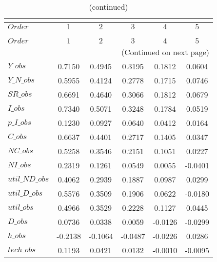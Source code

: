  
\begin{center}
\begin{longtable}{lccccc} 
\caption{COEFFICIENTS OF AUTOCORRELATION}\\
 \label{Table:th_autocorr_matrix}\\
\toprule 
$Order          $	 & 	 $          1$	 & 	 $          2$	 & 	 $          3$	 & 	 $          4$	 & 	 $          5$\\
\midrule \endfirsthead 
\caption{(continued)}\\
 \toprule \\ 
$Order          $	 & 	 $          1$	 & 	 $          2$	 & 	 $          3$	 & 	 $          4$	 & 	 $          5$\\
\midrule \endhead 
\midrule \multicolumn{6}{r}{(Continued on next page)} \\ \bottomrule \endfoot 
\bottomrule \endlastfoot 
$Y\_obs         $	 & 	     0.7150	 & 	     0.4945	 & 	     0.3195	 & 	     0.1812	 & 	     0.0604 \\ 
$Y\_N\_obs      $	 & 	     0.5955	 & 	     0.4124	 & 	     0.2778	 & 	     0.1715	 & 	     0.0746 \\ 
$SR\_obs        $	 & 	     0.6691	 & 	     0.4640	 & 	     0.3066	 & 	     0.1812	 & 	     0.0679 \\ 
$I\_obs         $	 & 	     0.7340	 & 	     0.5071	 & 	     0.3248	 & 	     0.1784	 & 	     0.0519 \\ 
$p\_I\_obs      $	 & 	     0.1230	 & 	     0.0927	 & 	     0.0640	 & 	     0.0412	 & 	     0.0164 \\ 
$C\_obs         $	 & 	     0.6637	 & 	     0.4401	 & 	     0.2717	 & 	     0.1405	 & 	     0.0347 \\ 
$NC\_obs        $	 & 	     0.5258	 & 	     0.3546	 & 	     0.2151	 & 	     0.1051	 & 	     0.0227 \\ 
$NI\_obs        $	 & 	     0.2319	 & 	     0.1261	 & 	     0.0549	 & 	     0.0055	 & 	    -0.0401 \\ 
$util\_ND\_obs  $	 & 	     0.4062	 & 	     0.2939	 & 	     0.1887	 & 	     0.0987	 & 	     0.0299 \\ 
$util\_D\_obs   $	 & 	     0.5576	 & 	     0.3509	 & 	     0.1906	 & 	     0.0622	 & 	    -0.0180 \\ 
$util\_obs      $	 & 	     0.4966	 & 	     0.3529	 & 	     0.2228	 & 	     0.1127	 & 	     0.0445 \\ 
$D\_obs         $	 & 	     0.0736	 & 	     0.0338	 & 	     0.0059	 & 	    -0.0126	 & 	    -0.0299 \\ 
$h\_obs         $	 & 	    -0.2138	 & 	    -0.1064	 & 	    -0.0487	 & 	    -0.0226	 & 	     0.0286 \\ 
$tech\_obs      $	 & 	     0.1193	 & 	     0.0421	 & 	     0.0132	 & 	    -0.0010	 & 	    -0.0095 \\ 
\end{longtable}
 \end{center}
